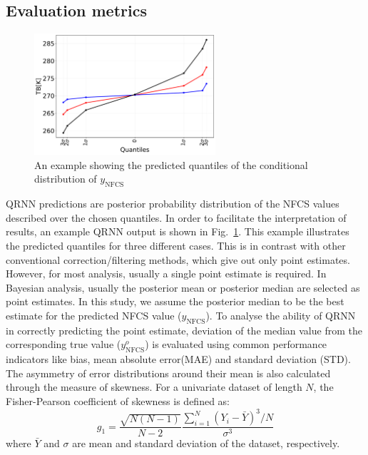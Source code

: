 \documentclass[amt, manuscript]{copernicus}
\newcommand{\ynfcs}{y_\text{NFCS}}
\newcommand{\yonfcs}{y^{o}_\text{NFCS}}
\begin{document}
\subsection{Evaluation metrics}
\label{sec:validation}
\begin{figure}[t]
	\centering
	\includegraphics[height=45mm]{Figures/posterior_distribution_I1V.pdf} 
	\caption{An example showing the predicted quantiles of the conditional distribution of $\ynfcs$ }
	\label{fig:posterior_distribution_I1V}	
\end{figure}
QRNN predictions are posterior probability distribution of the NFCS values described over the chosen quantiles. In order to facilitate the interpretation of results, an example QRNN output is shown in Fig.~\ref{fig:posterior_distribution_I1V}. This example illustrates the predicted quantiles for three different cases. This is in contrast with other conventional correction/filtering methods, which give out only point estimates. However, for most analysis, usually a single point estimate is required. In Bayesian analysis, usually the posterior mean or posterior median are selected as point estimates. In this study, we assume the posterior median to be the best estimate for the predicted NFCS value ($\ynfcs$). To analyse the ability of QRNN in correctly predicting the point estimate, deviation of the median value from the corresponding true value ($\yonfcs$) is evaluated using common performance indicators like bias, mean absolute error(MAE) and standard deviation (STD). The asymmetry of error distributions around their mean is also calculated through the measure of skewness. For a univariate dataset of length $N$, the Fisher-Pearson coefficient of skewness is defined as: 
\begin{equation}
g_1 = 	\frac{\sqrt{N(N-1)}}{N-2} \frac{\sum_{i = 1}^{N}(Y_i - \bar{Y})^3/N}{\sigma^3}
\end{equation}
where $\bar{Y}$ and $\sigma$ are mean and standard deviation of the dataset, respectively.
\end{document}
